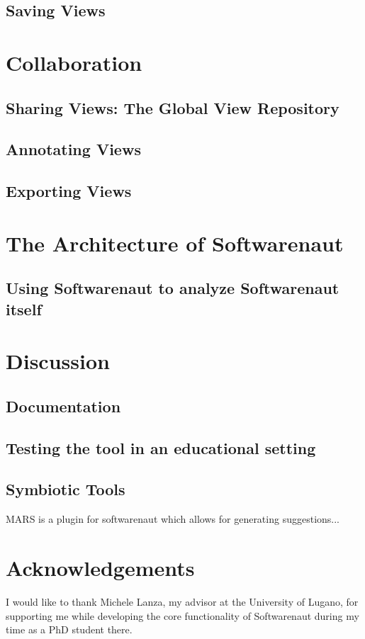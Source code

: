 \documentclass[preprint,12pt]{elsarticle}
\begin{document}
\subsection {Saving Views}


\section {Collaboration}
\subsection {Sharing Views: The Global View Repository}
\subsection {Annotating Views}
\subsection {Exporting Views}


\section {The Architecture of Softwarenaut}

\subsection{Using Softwarenaut to analyze Softwarenaut itself}


\section {Discussion}

\subsection {Documentation}
\subsection {Testing the tool in an educational setting}
\subsection {Symbiotic Tools}
MARS is a plugin for softwarenaut which allows for generating suggestions...



\section {Acknowledgements}
I would like to thank Michele Lanza, my advisor at the University 
of Lugano, for supporting me while developing the core functionality 
of Softwarenaut during my time as a PhD student there. 
\end{document}
